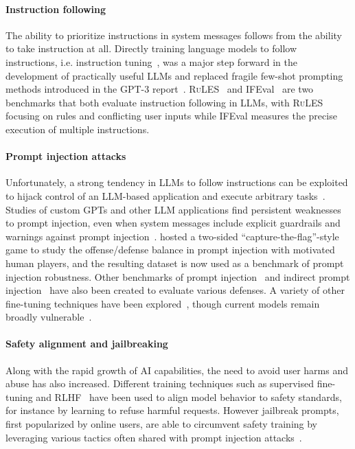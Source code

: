 \paragraph{Instruction following}
The ability to prioritize instructions in system messages follows from the ability to take instruction at all.
Directly training language models to follow instructions, i.e. instruction tuning~\citep{wei2021finetuned, khashabi2020unifiedqa, weller2020learning, mishra2021cross, sanh2021multitask, Ouyang2022-wv}, was a major step forward in the development of practically useful LLMs and replaced fragile few-shot prompting methods introduced in the GPT-3 report~\citep{brown2020language}.
\textsc{RuLES}~\citep{muCanLLMsFollow2024} and IFEval~\citep{zhou2023instruction} are two benchmarks that both evaluate instruction following in LLMs, with \textsc{RuLES} focusing on rules and conflicting user inputs while IFEval measures the precise execution of multiple instructions.

\paragraph{Prompt injection attacks}
Unfortunately, a strong tendency in LLMs to follow instructions can be exploited to hijack control of an LLM-based application and execute arbitrary tasks~\citep{Branch2022-ck, perezIgnorePreviousPrompt2022, greshakeNotWhatYouve2023}.
Studies of custom GPTs and other LLM applications find persistent weaknesses to prompt injection, even when system messages include explicit guardrails and warnings against prompt injection~\citep{yuAssessingPromptInjection2024, liuPromptInjectionAttack2024}.
\citet{toyer2023tensor} hosted a two-sided ``capture-the-flag''-style game to study the offense/defense balance in prompt injection with motivated human players, and the resulting dataset is now used as a benchmark of prompt injection robustness.
Other benchmarks of prompt injection~\citep{schulhoffIgnoreThisTitle2024, li2024evaluating} and indirect prompt injection~\citep{yi2023benchmarking} have also been created to evaluate various defenses.
A variety of other fine-tuning techniques have been explored~\citep{chenStruQDefendingPrompt2024, piet2024jatmo, yi2023benchmarking, wallaceInstructionHierarchyTraining2024, wu2024instructionalsegmentembeddingimproving}, though current models remain broadly vulnerable~\citep{rehbergerBreakingInstructionHierarchy2024}.

\paragraph{Safety alignment and jailbreaking}
Along with the rapid growth of AI capabilities, the need to avoid user harms and abuse has also increased.
Different training techniques such as supervised fine-tuning and RLHF~\citep{Bai2022-bz, Bai2022-zx, Ouyang2022-wv, glaese2022improving, achiam2023gpt} have been used to align model behavior to safety standards, for instance by learning to refuse harmful requests.
However jailbreak prompts, first popularized by online users, are able to circumvent safety training by leveraging various tactics often shared with prompt injection attacks~\citep{Kang2023-qa, Zou2023-lc, Wei2023-be, mazeika2024harmbench}.